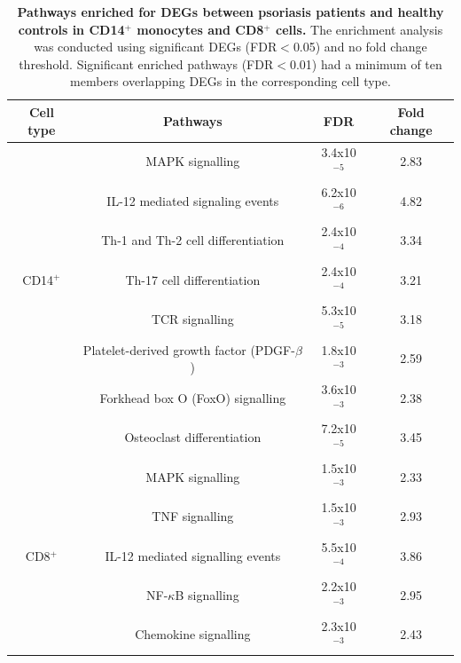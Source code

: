 \begin{table}[htbp]
\renewcommand{\arraystretch}{0.8}
\centering
\begin{tabular}{@{} c c c c}
\toprule
\textbf{Cell type}     & \textbf{Pathways}                   & \textbf{FDR} &  \textbf{Fold change} \\
\midrule
\midrule
                      & MAPK signalling                      &3.4x10$^{-5}$  &  2.83 \\
											
                      & IL-12 mediated signaling events      &6.2x10$^{-6}$  &  4.82 \\
				              & Th-1 and Th-2 cell differentiation   &2.4x10$^{-4}$  &  3.34  \\
CD14$^+$              & Th-17 cell differentiation           &2.4x10$^{-4}$  &  3.21 \\
				              & TCR signalling                       &5.3x10$^{-5}$  &  3.18 \\
				              & Platelet-derived growth factor (PDGF-$\beta$) & 1.8x10$^{-3}$& 2.59 \\
				              & Forkhead box O (FoxO) signalling     &3.6x10$^{-3}$  &  2.38 \\
\midrule				
                      & Osteoclast differentiation           &7.2x10$^{-5}$  &3.45  \\
                      & MAPK signalling                      &1.5x10$^{-3}$  &2.33 \\
				              & TNF signalling                       &1.5x10$^{-3}$  &2.93 \\
CD8$^+$               & IL-12 mediated signalling events     &5.5x10$^{-4}$  &3.86 \\
				              & NF-$\kappa$B signalling              &2.2x10$^{-3}$  &2.95 \\
				              & Chemokine signalling                 &2.3x10$^{-3}$  &2.43  \\
\bottomrule
\end{tabular}
\medskip %
\caption[Pathways enriched for DEGs between psoriasis patients and healthy controls in CD14$^+$ monocytes and CD8$^+$ cells.]{\textbf{Pathways enriched for DEGs between psoriasis patients and healthy controls in CD14$^+$ monocytes and CD8$^+$ cells.} The enrichment analysis was conducted using significant DEGs (FDR$<$0.05) and no fold change threshold. Significant enriched pathways (FDR$<$0.01) had a minimum of ten members overlapping DEGs in the corresponding cell type.}
\label{tab:RNAseq_PS_CTL_pathway_enrichment}
\end{table}


